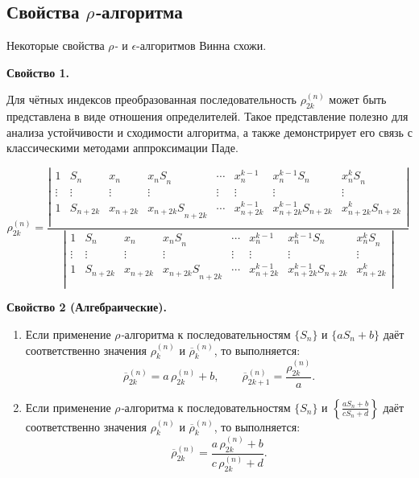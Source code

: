 \documentclass[14pt, a4paper]{extarticle}
\theoremstyle{definition}
\theoremstyle{remark}
\begin{document}
\subsection*{Свойства \emph{$\rho$-}алгоритма}

Некоторые свойства \emph{$\rho$-} и \(\epsilon\)-алгоритмов Винна схожи.

\textbf{Свойство 1.}  

Для чётных индексов преобразованная последовательность \(\rho_{2k}^{(n)}\) может быть представлена в виде отношения определителей.  
Такое представление полезно для анализа устойчивости и сходимости алгоритма,
а также демонстрирует его связь с классическими методами аппроксимации Паде.


\[\rho_{2k}^{(n)} = \frac{\left| \begin{matrix}
1 & S_{n} & x_{n} & {x_{n}S}_{n} & \cdots & x_{n}^{k - 1} & x_{n}^{k - 1}S_{n} & {x_{n}^{k}S}_{n} \\
 \vdots & \vdots & \vdots & \vdots & \vdots & \vdots & \vdots & \vdots \\
1 & S_{n + 2k} & x_{n + 2k} & {x_{n + 2k}S}_{n + 2k} & \cdots & x_{n + 2k}^{k - 1} & x_{n + 2k}^{k - 1}S_{n + 2k} & x_{n + 2k}^{k}S_{n + 2k} \\
\end{matrix} \right|}{\left| \begin{matrix}
1 & S_{n} & x_{n} & {x_{n}S}_{n} & \cdots & x_{n}^{k - 1} & x_{n}^{k - 1}S_{n} & {x_{n}^{k}S}_{n} \\
 \vdots & \vdots & \vdots & \vdots & \vdots & \vdots & \vdots & \vdots \\
1 & S_{n + 2k} & x_{n + 2k} & {x_{n + 2k}S}_{n + 2k} & \cdots & x_{n + 2k}^{k - 1} & x_{n + 2k}^{k - 1}S_{n + 2k} & x_{n + 2k}^{k} \\
\end{matrix} \right|}\ \]


\textbf{Свойство 2 (Алгебраические).}  

\begin{enumerate}
    \item Если применение \emph{$\rho$-}алгоритма к последовательностям \(\{ S_{n} \}\) и \(\{ a S_{n} + b \}\) даёт соответственно значения \(\rho_{k}^{(n)}\) и \(\overline{\rho}_{k}^{(n)}\), то выполняется:
    \[
        \overline{\rho}_{2k}^{(n)} = a \, \rho_{2k}^{(n)} + b, \qquad
        \overline{\rho}_{2k + 1}^{(n)} = \frac{\rho_{2k}^{(n)}}{a}.
    \]
    
    \item Если применение \emph{$\rho$-}алгоритма к последовательностям \(\{ S_{n} \}\) и \(\left\{ \frac{a S_{n} + b}{c S_{n} + d} \right\}\) даёт соответственно значения \(\rho_{k}^{(n)}\) и \(\overline{\rho}_{k}^{(n)}\), то выполняется:
    \[
        \overline{\rho}_{2k}^{(n)} = \frac{a \, \rho_{2k}^{(n)} + b}{c \, \rho_{2k}^{(n)} + d}.
    \]
\end{enumerate}
\end{document}
